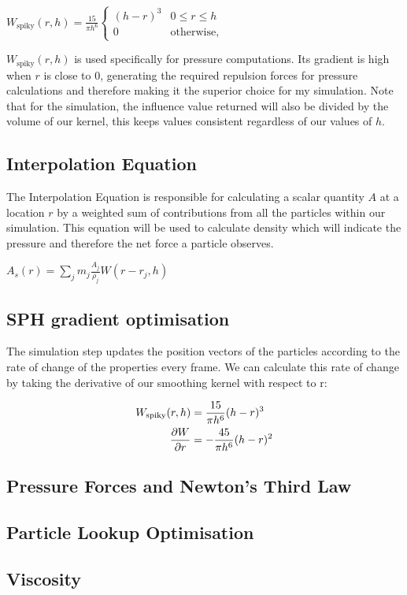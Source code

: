 \documentclass[write-up.tex]{subfiles}
\begin{document}
\begin{center}
$
    W_{\text{spiky}}(r, h) = \displaystyle \frac{15}{\pi h^6}
    \begin{cases}
        (h-r)^3 & 0 \leq r \leq h \\
        0 & \text{otherwise},
    \end{cases}
$
\end{center}


$W_{\text{spiky}}(r, h)$ is used specifically for pressure computations. Its gradient is high when $r$ is close to $0$, generating the required repulsion forces for pressure calculations and therefore making it the superior choice for my simulation. Note that for the simulation, the influence value returned will also be divided by the volume of our kernel, this keeps values consistent regardless of our values of $h$.

\subsection{Interpolation Equation}
The Interpolation Equation is responsible for calculating a scalar quantity $A$ at a location $r$ by a weighted sum of contributions from all the particles within our simulation. This equation will be used to calculate density which will indicate the pressure and therefore the net force a particle observes.
\begin{center}
$
    A_s(r) = \sum_{j} m_j \frac{A_j}{\rho_j}W(r-r_j, h)
$
\end{center}

\subsection{SPH gradient optimisation}

The simulation step updates the position vectors of the particles according to the rate of change of the properties every frame. We can calculate this rate of change by taking the derivative of our smoothing kernel with respect to r:

\begin{align*}
W_{\text{spiky}}(r, h) &= \displaystyle \frac{15}{\pi h^6} (h-r)^3 \\
\pdv{W}{r} &= -\frac{45}{\pi h^6} (h-r)^2
\end{align*}

\subsection{Pressure Forces and Newton's Third Law}

\subsection{Particle Lookup Optimisation}
\subsection{Viscosity}
\end{document}
